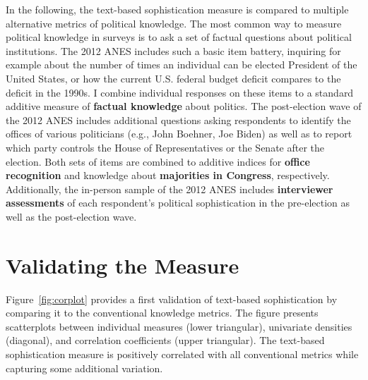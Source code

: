\documentclass[12pt]{article}
\begin{document}
In the following, the text-based sophistication measure is compared to multiple alternative metrics of political knowledge. The most common way to measure political knowledge in surveys is to ask a set of factual questions about political institutions. The 2012 ANES includes such a basic item battery, inquiring for example about the number of times an individual can be elected President of the United States, or how the current U.S. federal budget deficit compares to the deficit in the 1990s. I combine individual responses on these items to a standard additive measure of \textbf{factual knowledge} about politics. The post-election wave of the 2012 ANES includes additional questions asking respondents to identify the offices of various politicians (e.g., John Boehner, Joe Biden) as well as to report which party controls the House of Representatives or the Senate after the election. Both sets of items are combined to additive indices for \textbf{office recognition} and knowledge about \textbf{majorities in Congress}, respectively. Additionally, the in-person sample of the 2012 ANES includes \textbf{interviewer assessments} of each respondent's political sophistication in the pre-election as well as the post-election wave.


\section*{Validating the Measure}

Figure~\ref{fig:corplot} provides a first validation of text-based sophistication by comparing it to the conventional knowledge metrics. The figure presents scatterplots between individual measures (lower triangular), univariate densities (diagonal), and correlation coefficients (upper triangular). The text-based sophistication measure is positively correlated with all conventional metrics while capturing some additional variation.
\end{document}
